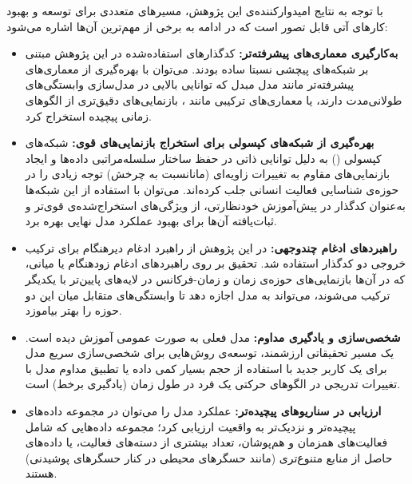 با توجه به نتایج امیدوارکننده‌ی این پژوهش، مسیرهای متعددی برای توسعه و بهبود کارهای آتی قابل تصور است که در ادامه به برخی از مهم‌ترین آن‌ها اشاره می‌شود:
\begin{itemize}
    \item \textbf{به‌کارگیری معماری‌های پیشرفته‌تر:} کدگذار‌های استفاده‌شده در این پژوهش مبتنی بر شبکه‌های پیچشی نسبتا ساده بودند. می‌توان با بهره‌گیری از معماری‌های پیشرفته‌تر مانند مدل مبدل که توانایی بالایی در مدل‌سازی وابستگی‌های طولانی‌مدت دارند، یا معماری‌های ترکیبی مانند ، بازنمایی‌های دقیق‌تری از الگوهای زمانی پیچیده استخراج کرد.
    \item \textbf{بهره‌گیری از شبکه‌های کپسولی برای استخراج بازنمایی‌های قوی:} شبکه‌های کپسولی\cite{hinton2018matrix} () به دلیل توانایی ذاتی در حفظ ساختار سلسله‌مراتبی داده‌ها و ایجاد بازنمایی‌های مقاوم به تغییرات زاویه‌ای (مانانسبت به چرخش) توجه زیادی را در حوزه‌ی شناسایی فعالیت انسانی جلب کرده‌اند\cite{ramu2025human,feraydounraad2025distance}. می‌توان با استفاده از این شبکه‌ها به‌عنوان کدگذار در پیش‌آموزش خودنظارتی، از ویژگی‌های استخراج‌شده‌ی قوی‌تر و ثبات‌یافته آن‌ها برای بهبود عملکرد مدل نهایی بهره برد.
    \item \textbf{راهبردهای ادغام چندوجهی:} در این پژوهش از راهبرد ادغام دیرهنگام برای ترکیب خروجی دو کدگذار استفاده شد. تحقیق بر روی راهبردهای ادغام زودهنگام یا میانی، که در آن‌ها بازنمایی‌های حوزه‌ی زمان و زمان-فرکانس در لایه‌های پایین‌تر با یکدیگر ترکیب می‌شوند، می‌تواند به مدل اجازه دهد تا وابستگی‌های متقابل میان این دو حوزه را بهتر بیاموزد.
    \item \textbf{شخصی‌سازی و یادگیری مداوم:} مدل فعلی به صورت عمومی آموزش دیده است. یک مسیر تحقیقاتی ارزشمند، توسعه‌ی روش‌هایی برای شخصی‌سازی سریع مدل برای یک کاربر جدید با استفاده از حجم بسیار کمی داده یا تطبیق مداوم مدل با تغییرات تدریجی در الگوهای حرکتی یک فرد در طول زمان (یادگیری برخط) است.
    \item \textbf{ارزیابی در سناریوهای پیچیده‌تر:} عملکرد مدل را می‌توان در مجموعه داده‌های پیچیده‌تر و نزدیک‌تر به واقعیت ارزیابی کرد؛ مجموعه داده‌هایی که شامل فعالیت‌های همزمان و هم‌پوشان، تعداد بیشتری از دسته‌های فعالیت، یا داده‌های حاصل از منابع متنوع‌تری (مانند حسگرهای محیطی در کنار حسگرهای پوشیدنی) هستند.
\end{itemize}

